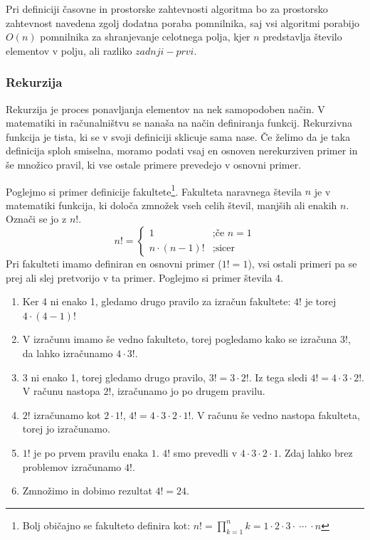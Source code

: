 \documentclass[a4paper,oneside,12pt]{article}
\begin{document}
Pri definiciji časovne in prostorske zahtevnosti algoritma bo za prostorsko zahtevnost 
navedena zgolj dodatna poraba pomnilnika, saj vsi algoritmi porabijo $O(n)$ pomnilnika za
shranjevanje celotnega polja, kjer $n$ predstavlja število elementov v polju, ali razliko
$zadnji - prvi$. 

\subsubsection{Rekurzija}
\label{chapter:rekurzija}
Rekurzija je proces ponavljanja elementov na nek samopodoben način. V matematiki in 
računalništvu se nanaša na način definiranja funkcij. Rekurzivna funkcija je tista, 
ki se v svoji definiciji sklicuje sama nase. Če želimo da je taka definicija sploh 
smiselna, moramo podati vsaj en osnoven nerekurziven primer in še množico pravil, 
ki vse ostale primere prevedejo v osnovni primer.

Poglejmo si primer definicije fakultete\footnote{Bolj običajno se fakulteto definira kot:
$n! = \displaystyle\prod_{k=1}^{n} k = 1 \cdot 2 \cdot 3 \cdot \ \cdots\  \cdot n$}. Fakulteta naravnega števila $n$ je v matematiki
funkcija, ki določa zmnožek vseh celih števil, manjših ali enakih $n$. Označi se jo z $n!$.
\[
n! = \left\{ 
\begin{array}{rl}
     1             & \mbox{;če $n = 1$} \\
     n \cdot (n-1)!& \mbox{;sicer}
\end{array} \right.
\]
Pri fakulteti imamo definiran en osnovni primer ($1! = 1$), vsi ostali primeri pa se prej
ali slej pretvorijo v ta primer. Poglejmo si primer števila 4.
\begin{enumerate}
  \item Ker 4 ni enako 1, gledamo drugo pravilo za izračun fakultete: $4!$ je torej $4
    \cdot (4 - 1)!$
  \item V izračunu imamo še vedno fakulteto, torej pogledamo kako se izračuna $3!$, da
    lahko izračunamo $4 \cdot 3!$.
  \item 3 ni enako 1, torej gledamo drugo pravilo, $3! = 3 \cdot 2!$. Iz tega sledi $4! =
    4 \cdot 3 \cdot 2!$. V računu nastopa $2!$, izračunamo jo po drugem pravilu.
  \item $2!$ izračunamo kot $2 \cdot 1!$, $4! = 4 \cdot 3 \cdot 2 \cdot 1!$. V računu še
    vedno nastopa fakulteta, torej jo izračunamo.
  \item $1!$ je po prvem pravilu enaka $1$. $4!$ smo prevedli v $4 \cdot 3 \cdot 2 \cdot
    1$. Zdaj lahko brez problemov izračunamo $4!$.
  \item Zmnožimo in dobimo rezultat $4! = 24$.
\end{enumerate}
\end{document}
